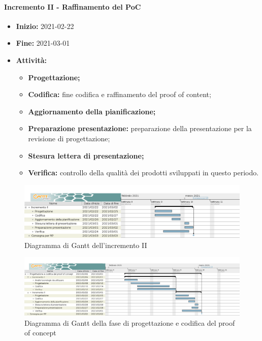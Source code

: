\paragraph[Incremento II]{Incremento II - \textnormal{Raffinamento del PoC}}
\begin{itemize}
    \item [] \textbf{Inizio:} 2021-02-22
    \item [] \textbf{Fine:} 2021-03-01
    \item [] \textbf{Attività:}
          \begin{itemize}
              \item \textbf{Progettazione;}
              \item \textbf{Codifica:} fine codifica e raffinamento del proof of content;
              \item \textbf{Aggiornamento della pianificazione;}
              \item \textbf{Preparazione presentazione:} preparazione della presentazione per la revisione di progettazione;
              \item \textbf{Stesura lettera di presentazione;}
              \item \textbf{Verifica:} controllo della qualità dei prodotti sviluppati in questo periodo.
          \end{itemize}
\end{itemize}

\begin{figure}[H]
    \centering
    \includegraphics[width=1\linewidth]{res/images/pianificazione/incremento_2.png}
    \caption{Diagramma di Gantt dell'incremento II}
    \label{fig:_Gantt incremento II}
\end{figure}

\begin{figure}[H]
    \centering
    \includegraphics[width=1\linewidth]{res/images/pianificazione/progettazione_e_codifica_del_proof_of_concept.png}
    \caption{Diagramma di Gantt della fase di progettazione e codifica del proof of concept}
    \label{fig:_Gantt progettazione e codifica del proof of concept}
\end{figure}

